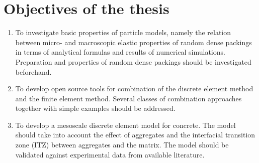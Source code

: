 \section{Objectives of the thesis}
\begin{enumerate}

\item
To investigate basic properties of particle models, namely the relation between micro- and macroscopic elastic properties of random dense packings in terms of analytical formulas and results of numerical simulations.
Preparation and properties of random dense packings should be investigated beforehand.

\item
To develop open source tools for combination of the discrete element method and the finite element method.
Several classes of combination approaches together with simple examples should be addressed.

\item
To develop a mesoscale discrete element model for concrete.
The model should take into account the effect of aggregates and the interfacial transition zone (ITZ) between aggregates and the matrix.
The model should be validated against experimental data from available literature.

\end{enumerate}
